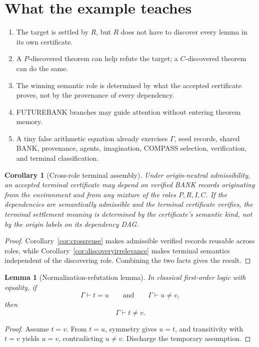 \documentclass[11pt,openany]{book}
\newtheorem{corollary}[theorem]{Corollary}
\newtheorem{lemma}[theorem]{Lemma}
\theoremstyle{definition}
\theoremstyle{remark}
\begin{document}
\section{What the example teaches}
\begin{enumerate}
\item The target is settled by $R$, but $R$ does not have to discover every lemma in its own certificate.
\item A $P$-discovered theorem can help refute the target; a $C$-discovered theorem can do the same.
\item The winning semantic role is determined by what the accepted certificate proves, not by the provenance of every dependency.
\item FUTUREBANK branches may guide attention without entering theorem memory.
\item A tiny false arithmetic equation already exercises $\Gamma$, seed records, shared BANK, provenance, agents, imagination, COMPASS selection, verification, and terminal classification.
\end{enumerate}

\begin{corollary}[Cross-role terminal assembly]\label{cor:crossroleassembly}
Under origin-neutral admissibility, an accepted terminal certificate may depend on verified BANK records originating from the environment and from any mixture of the roles $P,R,I,C$. If the dependencies are semantically admissible and the terminal certificate verifies, the terminal settlement meaning is determined by the certificate's semantic kind, not by the origin labels on its dependency DAG.
\end{corollary}
\begin{proof}
Corollary~\ref{cor:crossreuse} makes admissible verified records reusable across roles, while Corollary~\ref{cor:discoveryirrelevance} makes terminal semantics independent of the discovering role. Combining the two facts gives the result.
\end{proof}

\begin{lemma}[Normalization-refutation lemma]\label{lem:normrefute}
In classical first-order logic with equality, if
\[
\Gamma\vdash t=u
\qquad\text{and}\qquad
\Gamma\vdash u\neq v,
\]
then
\[
\Gamma\vdash t\neq v.
\]
\end{lemma}
\begin{proof}
Assume $t=v$. From $t=u$, symmetry gives $u=t$, and transitivity with $t=v$ yields $u=v$, contradicting $u\neq v$. Discharge the temporary assumption.
\end{proof}
\end{document}
